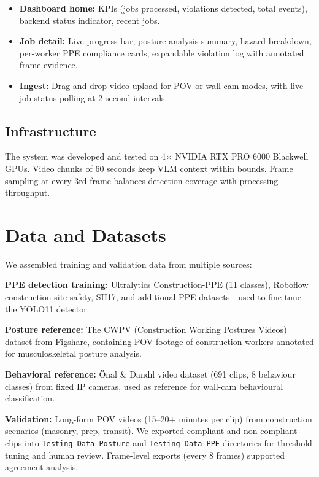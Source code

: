 \documentclass[11pt, twocolumn]{article}
\begin{document}
\begin{itemize}[nosep, leftmargin=*]
    \item \textbf{Dashboard home:} KPIs (jobs processed, violations detected, total events), backend status indicator, recent jobs.
    \item \textbf{Job detail:} Live progress bar, posture analysis summary, hazard breakdown, per-worker PPE compliance cards, expandable violation log with annotated frame evidence.
    \item \textbf{Ingest:} Drag-and-drop video upload for POV or wall-cam modes, with live job status polling at 2-second intervals.
\end{itemize}

\subsection{Infrastructure}

The system was developed and tested on 4$\times$ NVIDIA RTX PRO 6000 Blackwell GPUs. Video chunks of 60 seconds keep VLM context within bounds. Frame sampling at every 3rd frame balances detection coverage with processing throughput.

\section{Data and Datasets}

We assembled training and validation data from multiple sources:

\textbf{PPE detection training:} Ultralytics Construction-PPE (11 classes), Roboflow construction site safety, SH17, and additional PPE datasets---used to fine-tune the YOLO11 detector.

\textbf{Posture reference:} The CWPV (Construction Working Postures Videos) dataset from Figshare, containing POV footage of construction workers annotated for musculoskeletal posture analysis.

\textbf{Behavioral reference:} \"Onal \& Dand{\i}l video dataset (691 clips, 8 behaviour classes) from fixed IP cameras, used as reference for wall-cam behavioural classification.

\textbf{Validation:} Long-form POV videos (15--20+ minutes per clip) from construction scenarios (masonry, prep, transit). We exported compliant and non-compliant clips into \texttt{Testing\_Data\_Posture} and \texttt{Testing\_Data\_PPE} directories for threshold tuning and human review. Frame-level exports (every 8 frames) supported agreement analysis.
\end{document}
